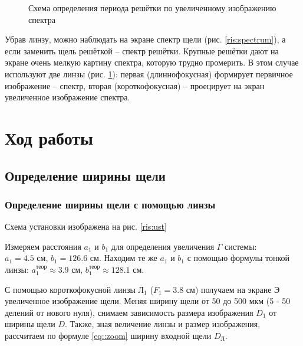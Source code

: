 \documentclass[a5paper,10pt, twoside]{article} %
\begin{document}
\begin{figure}[h]
	\caption{Схема определения периода решётки по увеличенному изображению спектра}
	\label{ris:d_per}
\end{figure}

Убрав линзу, можно наблюдать на экране спектр щели (рис. \ref{ris:spectrum}), а если заменить 
щель решёткой -- спектр решётки. Крупные решётки дают на экране очень мелкую картину спектра, 
которую трудно промерить. В этом случае используют две линзы (рис. \ref{ris:d_per}): первая 
(длиннофокусная) формирует первичное изображение -- спектр, вторая (короткофокусная) -- 
проецирует на экран увеличенное изображение спектра.




\section{Ход работы}

\subsection{Определение ширины щели}

\subsubsection{Определение ширины щели с помощью линзы}

	Схема установки изображена на рис. \ref{ris:ust}

	Измеряем расстояния $a_1$ и $b_1$ для определения увеличения $\Gamma$ системы: 
	$ a_1 = 4.5 \text{ см, } b_1 = 126.6 \text{ см} $. Находим те же $a_1$ и $b_1$ с помощью формулы 
	тонкой линзы: 
	$ a_1^{\text{теор}} \approx 3.9 \text{ см, } b_1^{\text{теор}} \approx 128.1 \text{ см} $.

	С помощью короткофокусной линзы $\text{Л}_1$ ($F_1 = 3.8$ см) получаем на экране $\text{Э}$
	увеличенное изображение щели. Меняя ширину щели от 50 до 500 мкм (5 - 50 делений от нового нуля), 
	снимаем зависимость размера изображения $D_1$ от ширины щели $D$. Также, зная величение линзы и
	размер изображения, рассчитаем по формуле \eqref{eq::zoom} ширину входной щели $D_{\text{Л}}$.
\end{document}
